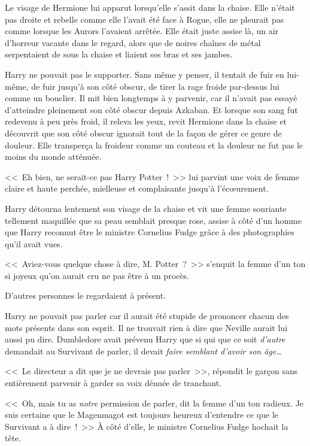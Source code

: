Le visage de Hermione lui apparut lorsqu'elle s'assit dans la chaise. Elle n'était pas droite et rebelle comme elle l'avait été face à Rogue, elle ne pleurait pas comme lorsque les Aurors l'avaient arrêtée. Elle était juste assise là, un air d'horreur vacante dans le regard, alors que de noires chaînes de métal serpentaient de sous la chaise et liaient ses bras et ses jambes.

Harry ne pouvait pas le supporter. Sans même y penser, il tentait de fuir en lui-même, de fuir jusqu'à son côté obscur, de tirer la rage froide par-dessus lui comme un bouclier. Il mit bien longtemps à y parvenir, car il n'avait pas essayé d'atteindre pleinement son côté obscur depuis Azkaban. Et lorsque son sang fut redevenu à peu près froid, il releva les yeux, revit Hermione dans la chaise et découvrit que son côté obscur ignorait tout de la façon de gérer ce genre de douleur. Elle transperça la froideur comme un couteau et la douleur ne fut pas le moins du monde atténuée.

<<~Eh bien, ne serait-ce pas Harry Potter~!~>> lui parvint une voix de femme claire et haute perchée, mielleuse et complaisante jusqu'à l'écœurement.

Harry détourna lentement son visage de la chaise et vit une femme souriante tellement maquillée que sa peau semblait presque rose, assise à côté d'un homme que Harry reconnut être le ministre Cornelius Fudge grâce à des photographies qu'il avait vues.

<<~Aviez-vous quelque chose à dire, M. Potter~?~>> s'enquit la femme d'un ton si joyeux qu'on aurait cru ne pas être à un procès.

D'autres personnes le regardaient à présent.

Harry ne pouvait pas parler car il aurait été stupide de prononcer chacun des mots présents dans son esprit. Il ne trouvait rien à dire que Neville aurait lui aussi pu dire. Dumbledore avait prévenu Harry que si qui que ce soit \emph{d'autre} demandait au Survivant de parler, il devait \emph{faire semblant d'avoir son âge…}

<<~Le directeur a dit que je ne devrais pas parler~>>, répondit le garçon sans entièrement parvenir à garder sa voix dénuée de tranchant.

<<~Oh, mais tu as \emph{notre} permission de parler, dit la femme d'un ton radieux. Je suis certaine que le Magenmagot est toujours heureux d'entendre ce que le Survivant a à dire~!~>> À côté d'elle, le ministre Cornelius Fudge hochait la tête.

